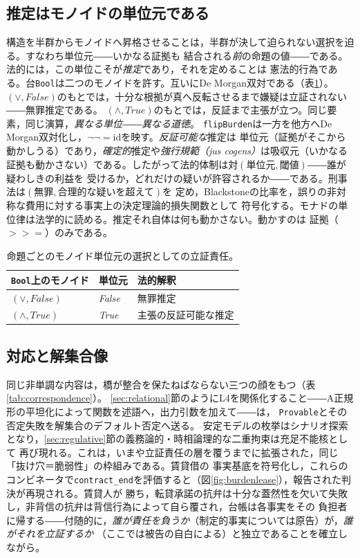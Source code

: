 \documentclass[11pt,a4paper]{ltjsarticle}
\newcommand{\code}[1]{\texttt{\small #1}}
\begin{document}
\subsection{推定はモノイドの単位元である}
構造を半群からモノイドへ昇格させることは，半群が決して迫られない選択を迫る。すなわち単位元――いかなる証拠も
結合される\emph{前}の命題の値――である。法的には，この単位こそが\emph{推定}であり，それを定めることは
憲法的行為である。台\code{Bool}は二つのモノイドを許す。互いにDe Morgan双対である（表\ref{tab:presumption}）。
$(\vee, \textit{False})$のもとでは，十分な根拠が真へ反転させるまで嫌疑は立証されない――無罪推定である。
$(\wedge, \textit{True})$のもとでは，反証まで主張が立つ。同じ要素，同じ演算，\emph{異なる単位――異なる道徳}。
\code{flipBurden}は一方を他方へDe Morgan双対化し，$\neg\neg = \mathrm{id}$を映す。\emph{反証可能な}推定は
単位元（証拠がそこから動かしうる）であり，\emph{確定的}推定や\emph{強行規範（jus cogens）}は吸収元（いかなる
証拠も動かさない）である。したがって法的体制は対$(\textit{単位元}, \textit{閾値})$――誰が疑わしきの利益を
受けるか，どれだけの疑いが許容されるか――である。刑事法は$(\textit{無罪}, \textit{合理的な疑いを超えて})$を
定め，Blackstoneの比率\cite{blackstone1769}を，誤りの非対称な費用に対する事実上の決定理論的損失関数として
符号化する\cite{hayspier1997burdens}。モナドの単位律は法学的に読める。推定それ自体は何も動かさない。動かすのは
証拠（$\mathbin{>\!\!>\!\!=}$）のみである。

\begin{table}[t]
\caption{命題ごとのモノイド単位元の選択としての立証責任。}
\label{tab:presumption}
\small
\begin{tabular}{@{}lll@{}}
\toprule
\textbf{\texttt{Bool}上のモノイド} & \textbf{単位元} & \textbf{法的解釈} \\
\midrule
$(\vee, \textit{False})$  & \textit{False} & 無罪推定 \\
$(\wedge, \textit{True})$ & \textit{True}  & 主張の反証可能な推定 \\
\bottomrule
\end{tabular}
\end{table}

\subsection{対応と解集合像}
同じ非単調な内容は，橋が整合を保たねばならない三つの顔をもつ（表\ref{tab:correspondence}）。
\ref{sec:relational}節のようにL4を関係化すること――A正規形の平坦化によって関数を述語へ，出力引数を加えて――は，
\code{Provable}とその否定失敗を解集合のデフォルト否定へ送る\cite{gelfond1988stable,dung1995argumentation}。
安定モデルの枚挙はシナリオ探索となり，\ref{sec:regulative}節の義務論的・時相論理的な二重拘束は充足不能核として
再び現れる。これは，いまや立証責任の層を覆うまでに拡張された，同じ「抜け穴＝脆弱性」の枠組みである。賃貸借の
事実基底を符号化し，これらのコンビネータで\code{contract\_end}を評価すると（図\ref{fig:burdenlease}），報告された判決が再現される。賃貸人が
勝ち，転貸承諾の抗弁は十分な蓋然性を欠いて失敗し，非背信の抗弁は背信行為によって自ら覆され，台帳は各事実をその
負担者に帰する――付随的に，\emph{誰が責任を負うか}（制定的事実については原告）が，\emph{誰がそれを立証するか}
（ここでは被告の自白による）と独立であることを確立しながら。
\end{document}
